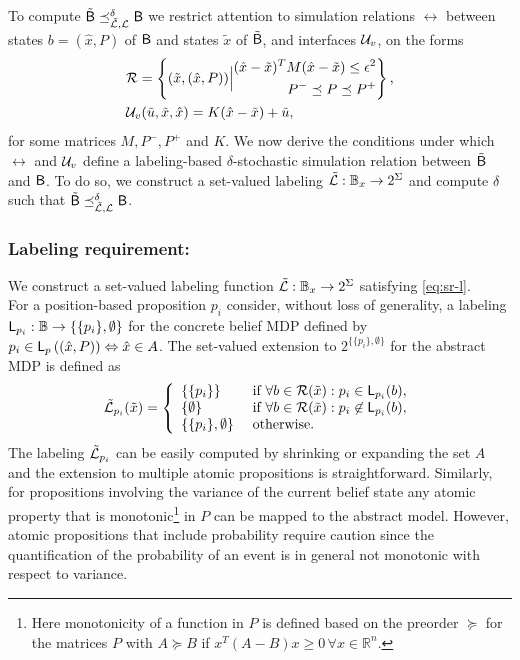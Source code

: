 \documentclass{ifacconf}
\begin{document}
To compute $\tilde {\mathsf{B}}\preceq^\delta_{\tilde {\mathcal{L}},\mathcal{L}} \mathsf{B}$ we restrict attention to simulation relations $\rel$ between states $b=(\hat x, P)$ of $\mathsf{B}$ and states $\tilde x$ of $\tilde {\mathsf{B}} $, and interfaces $\mathcal{U}_{v}$, on the forms
\begin{align}
  \label{eq:rel}
    & \mathcal{R} = \left\{(\tilde x, (\hat x, P ) ) \Big{|}\begin{aligned}
      (\hat x- \tilde x)^T M(\hat x-\tilde x)\leq \epsilon^2 \\
      P^-\preceq P \preceq   P^+
    \end{aligned} \right\}, \\
    & \mathcal{U}_{v}(\tilde u,  \tilde x, \hat x)  =K( \hat x - \tilde x)+\tilde u,  \label{eq:intf}
\end{align}
for some matrices $M, P^-, P^+$ and $K$. We now derive the conditions under which $\rel$ and $\mathcal{U}_{v}$ define a labeling-based $\delta$-stochastic simulation relation between $\tilde {\mathsf{B}}$ and $\mathsf{B}$. To do so, we construct a set-valued labeling $\tilde {\mathcal{L}}: \mathbb{B}_{x}\rightarrow 2^\Sigma$ and compute $\delta$ such that $\tilde {\mathsf{B}}\preceq^\delta_{\tilde{\mathcal{L}},\mathcal{L}} \mathsf{B} $.

\subsubsection{Labeling requirement:}

We construct a set-valued labeling function  $\tilde {\mathcal{L}}: \mathbb{B}_{x}\rightarrow 2^\Sigma$ satisfying \eqref{eq:sr-l}.
\\
For a position-based proposition $p_i$ consider, without loss of generality, a labeling $\mathsf{L}_{p_i}: \mathbb{B}\rightarrow \{\{p_i\},\emptyset\}$ for the concrete belief MDP defined by $p_i\in\mathsf{L}_p \left( (\hat x,P) \right)  \Leftrightarrow \hat x \in A$. The set-valued extension to $2^{\{\{p_i\},\emptyset\}}$ for the abstract MDP is defined as
 \begin{align}
 	\tilde {\mathcal{L}}_{p_i}(\tilde x) =\left\{\begin{array}{ll} \{\{p_i\}\} & \mbox{ if } \forall b \in \mathcal{R} (\tilde x):p_i\in\mathsf{L}_{p_i}(b), \\
 	  \{\emptyset \} & \mbox{ if } \forall b\in \mathcal{R} (\tilde x):{p_i}\not\in\mathsf{L}_{p_i}(b),\\
 	  \{\{p_i\},\emptyset\}&\mbox{ otherwise.}\end{array} \right.
 \end{align}
The labeling $\tilde {\mathcal{L}}_{p_i}$ can be easily computed by shrinking or expanding the set $A$ and the extension to multiple atomic propositions is straightforward. Similarly, for propositions involving the variance of the current belief state any atomic property that is monotonic\footnote{Here monotonicity of a function in $P$ is defined based on the preorder $\succeq $ for the matrices $P$ with $A\succeq B$ if $x^T(A-B)x\geq0\, \forall x\in\mathbb R^n$. } in $P$ can be mapped to the abstract model. However, atomic propositions that include probability require caution since the quantification of the probability of an event is in general not monotonic with respect to variance.
\end{document}
